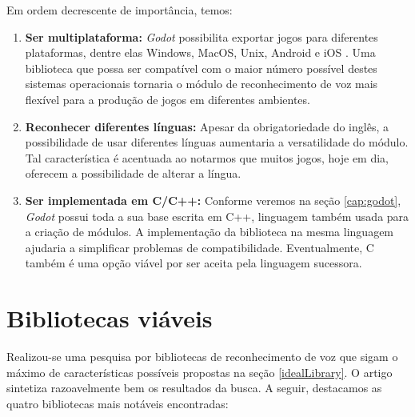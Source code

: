 Em ordem decrescente de importância, temos:

\begin{enumerate}
\item \textbf{Ser multiplataforma:} \textit{Godot} possibilita exportar jogos para diferentes plataformas, dentre elas Windows, MacOS, Unix, Android e iOS \citep{godotDeployPlatforms}. Uma biblioteca que possa ser compatível com o maior número possível destes sistemas operacionais tornaria o módulo de reconhecimento de voz mais flexível para a produção de jogos em diferentes ambientes.

\item \textbf{Reconhecer diferentes línguas:} Apesar da obrigatoriedade do inglês, a possibilidade de usar diferentes línguas aumentaria a versatilidade do módulo. Tal característica é acentuada ao notarmos que muitos jogos, hoje em dia, oferecem a possibilidade de alterar a língua.

\item \textbf{Ser implementada em C/C++:} Conforme veremos na seção \ref{cap:godot}, \textit{Godot} possui toda a sua base escrita em C++, linguagem também usada para a criação de módulos. A implementação da biblioteca na mesma linguagem ajudaria a simplificar problemas de compatibilidade. Eventualmente, C também é uma opção viável por ser aceita pela linguagem sucessora.
\end{enumerate}


\section{Bibliotecas viáveis}

Realizou-se uma pesquisa por bibliotecas de reconhecimento de voz que sigam o máximo de características possíveis propostas na seção \ref{idealLibrary}. O artigo \citep{sttLibs} sintetiza razoavelmente bem os resultados da busca. A seguir, destacamos as quatro bibliotecas mais notáveis encontradas:

